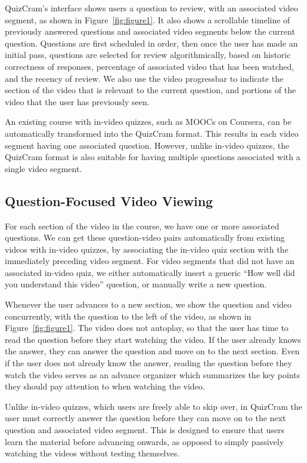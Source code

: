 \documentclass{sigchi}
\begin{document}
QuizCram's interface shows users a question to review, with an associated video segment, as shown in Figure~\ref{fig:figure1}. It also shows a scrollable timeline of previously answered questions and associated video segments below the current question. Questions are first scheduled in order, then once the user has made an initial pass, questions are selected for review algorithmically, based on historic correctness of responses, percentage of associated video that has been watched, and the recency of review. We also use the video progressbar to indicate the section of the video that is relevant to the current question, and portions of the video that the user has previously seen.

An existing course with in-video quizzes, such as MOOCs on Coursera, can be automatically transformed into the QuizCram format. This results in each video segment having one associated question. However, unlike in-video quizzes, the QuizCram format is also suitable for having multiple questions associated with a single video segment.

\subsection{Question-Focused Video Viewing}

For each section of the video in the course, we have one or more associated questions. We can get these question-video pairs automatically from existing videos with in-video quizzes, by associating the in-video quiz section with the immediately preceding video segment. For video segments that did not have an associated in-video quiz, we either automatically insert a generic ``How well did you understand this video'' question, or manually write a new question.

Whenever the user advances to a new section, we show the question and video concurrently, with the question to the left of the video, as shown in Figure~\ref{fig:figure1}. The video does not autoplay, so that the user has time to read the question before they start watching the video. If the user already knows the answer, they can answer the question and move on to the next section. Even if the user does not already know the answer, reading the question before they watch the video serves as an advance organizer which summarizes the key points they should pay attention to when watching the video.

Unlike in-video quizzes, which users are freely able to skip over, in QuizCram the user must correctly answer the question before they can move on to the next question and associated video segment. This is designed to ensure that users learn the material before advancing onwards, as opposed to simply passively watching the videos without testing themselves.
\end{document}
